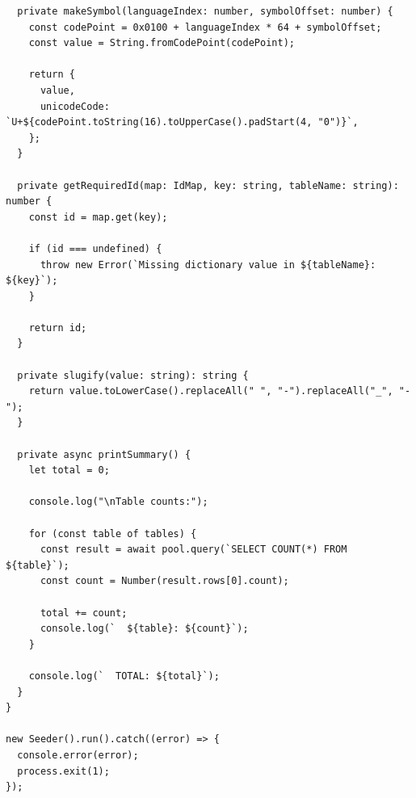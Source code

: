 \begin{verbatim}
  private makeSymbol(languageIndex: number, symbolOffset: number) {
    const codePoint = 0x0100 + languageIndex * 64 + symbolOffset;
    const value = String.fromCodePoint(codePoint);

    return {
      value,
      unicodeCode: `U+${codePoint.toString(16).toUpperCase().padStart(4, "0")}`,
    };
  }

  private getRequiredId(map: IdMap, key: string, tableName: string): number {
    const id = map.get(key);

    if (id === undefined) {
      throw new Error(`Missing dictionary value in ${tableName}: ${key}`);
    }

    return id;
  }

  private slugify(value: string): string {
    return value.toLowerCase().replaceAll(" ", "-").replaceAll("_", "-");
  }

  private async printSummary() {
    let total = 0;

    console.log("\nTable counts:");

    for (const table of tables) {
      const result = await pool.query(`SELECT COUNT(*) FROM ${table}`);
      const count = Number(result.rows[0].count);

      total += count;
      console.log(`  ${table}: ${count}`);
    }

    console.log(`  TOTAL: ${total}`);
  }
}

new Seeder().run().catch((error) => {
  console.error(error);
  process.exit(1);
});
\end{verbatim}
